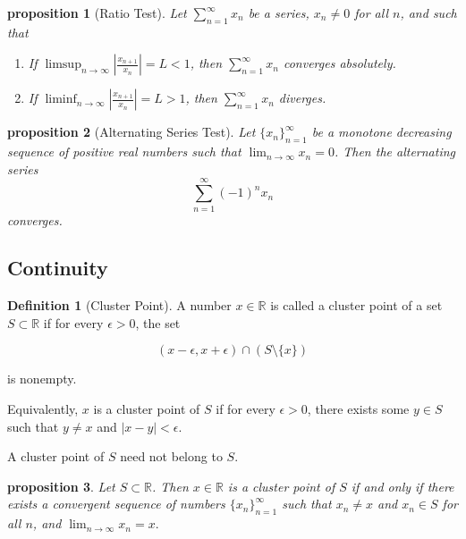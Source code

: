\documentclass{article}
\newtheorem{proposition}{Proposition}[section]
\newtheorem{proposition}{proposition}[section]
\theoremstyle{definition}
\newtheorem{definition}{Definition}[section]
\theoremstyle{remark}
\begin{document}
\begin{proposition}[Ratio Test]\label{prp:ratio_test_Series}
Let $\sum_{n=1}^{\infty} x_n$ be a series, $x_n \neq 0$ for all $n$, and such that
\begin{enumerate}
\item If $\limsup_{n \to \infty} \left| \frac{x_{n+1}}{x_n} \right|  = L < 1$, then $\sum_{n=1}^{\infty} x_n$ \textit{converges absolutely}.
\item If $\liminf_{n \to \infty} \left| \frac{x_{n+1}}{x_n} \right|  = L > 1$, then $\sum_{n=1}^{\infty} x_n$ \textit{diverges}.
\end{enumerate}
\end{proposition}






\begin{proposition}[Alternating Series Test]\label{prp:alt_series_test}
Let \( \{x_n\}_{n=1}^\infty \) be a monotone decreasing sequence of positive real numbers such that \(\lim_{n \to \infty} x_n = 0\). Then the alternating series
\[
\sum_{n=1}^\infty (-1)^n x_n
\]
converges.
\end{proposition}




\subsection{Continuity}





\begin{definition}[Cluster Point]\label{def:cluster_point}
A number \( x \in \mathbb{R} \) is called a cluster point of a set \( S \subset \mathbb{R} \) if for every \( \epsilon > 0 \), the set  

\[
(x - \epsilon, x + \epsilon) \cap (S \setminus \{x\})
\]

is nonempty.  

Equivalently, \( x \) is a cluster point of \( S \) if for every \( \epsilon > 0 \), there exists some \( y \in S \) such that \( y \neq x \) and \( |x - y| < \epsilon \).  

A cluster point of \( S \) need not belong to \( S \).
\end{definition}


\begin{proposition}
Let $S \subset \mathbb{R}$. Then $x \in \mathbb{R}$ is a cluster point of $S$ if and only if there exists a convergent sequence of numbers $\{x_n\}_{n=1}^{\infty}$ such that $x_n \neq x$ and $x_n \in S$ for all $n$, and 
\(
\lim_{n\to\infty} x_n = x.
\)
\end{proposition}
\end{document}
